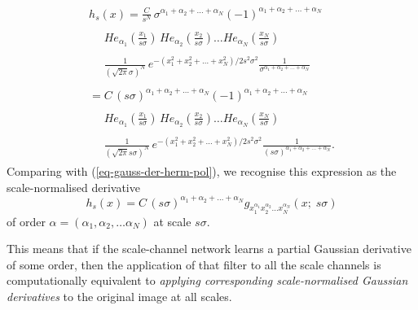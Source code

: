 \documentclass[twocolumn,runningheads]{svjour3}
\begin{document}
\begin{align}
\begin{split}
h_s(x) =\frac{C}{s^N} \, \sigma^{\alpha_1 + \alpha_2 + \dots + \alpha_N}
(-1)^{\alpha_1 + \alpha_2 + \dots + \alpha_N}
\end{split}\nonumber\\
\begin{split}
\phantom{=}
He_{\alpha_1}(\frac{x_1}{s\sigma}) \,  He_{\alpha_2}(\frac{x_2}{s\sigma}) \dots He_{\alpha_N}(\frac{x_N}{s\sigma}) 
\end{split}\nonumber\\
\begin{split}
\phantom{=}
\frac{1}{(\sqrt{2 \pi} \sigma)^N} \, e^{-(x_1^2 + x_2^2 + \dots + x_N^2)/2s^2\sigma^2} 
\frac{1}{\sigma^{\alpha_1 + \alpha_2 + \dots + \alpha_N} } 
\end{split}\nonumber\\
\begin{split}
=C \, (s \sigma)^{\alpha_1 + \alpha_2 + \dots + \alpha_N}
(-1)^{\alpha_1 + \alpha_2 + \dots + \alpha_N}
\end{split}\nonumber\\
\begin{split}
\phantom{=}
He_{\alpha_1}(\frac{x_1}{s\sigma}) \,  He_{\alpha_2}(\frac{x_2}{s\sigma}) \dots He_{\alpha_N}(\frac{x_N}{s\sigma}) 
\end{split}\nonumber\\
\begin{split}
\phantom{=}
\frac{1}{(\sqrt{2 \pi} s \sigma)^N} \, e^{-(x_1^2 + x_2^2 + \dots + x_N^2)/2s^2\sigma^2} 
\frac{1}{(s \sigma)^{\alpha_1 + \alpha_2 + \dots + \alpha_N} }.
\end{split}
\end{align}
Comparing with (\ref{eq-gauss-der-herm-pol}), we recognise this
expression as the scale-normalised derivative
\begin{equation}
h_s(x) = C \, (s \sigma)^{\alpha_1 + \alpha_2 + \dots + \alpha_N}
g_{x_1^{\alpha_1} x_2^{\alpha_2} \dots x_N^{\alpha_N}}(x;\; s \sigma)
\end{equation}
of order $\alpha = (\alpha_1, \alpha_2, \dots \alpha_N)$ at scale $s
\sigma$.

This means that if the scale-channel network learns a partial Gaussian
derivative of some order, then the application of that filter to all
the scale channels is computationally equivalent to 
{\em applying corresponding scale-normalised Gaussian derivatives\/}
to the original image at all scales.
\end{document}

